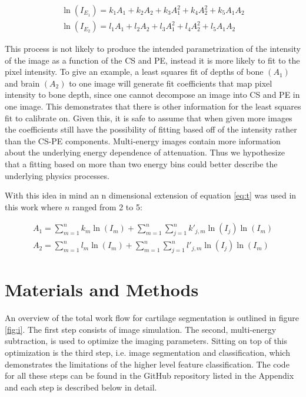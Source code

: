 \documentclass[a4paper,11pt]{article}
\begin{document}
\begin{subequations}\label{eq:t}
\begin{align}
\label{eq:t:1}
 \ln(I_{E_1}) = k_1 A_1 + k_2 A_2 +k_3A_1^2 +k_4 A_2^2 +k_5 A_1A_2 
\\
\label{eq:t:2}
\ln(I_{E_2}) = l_1 A_1 + l_2 A_2 +l_3A_1^2 +l_4 A_2^2 +l_5 A_1A_2 
\end{align}
\end{subequations}

This process is not likely to produce the intended parametrization of the intensity of the image as a function of the CS and PE, instead it is more likely to fit to the pixel intensity. To give an example, a least squares fit of depths of bone $(A_1)$ and brain $(A_2)$ to one image will generate fit coefficients that map pixel intensity to bone depth, since one cannot decompose an image into CS and PE in one image. This demonstrates that there is other information for the least squares fit to calibrate on. Given this, it is safe to assume that when given more images the coefficients still have the possibility of fitting based off of the intensity rather than the CS-PE components. Multi-energy images contain more information about the underlying energy dependence of attenuation. Thus we hypothesize that a fitting based on more than two energy bins could better describe the underlying physics processes.

With this idea in mind an n dimensional extension of equation \ref{eq:t} was used in this work where $n$ ranged from 2 to 5:

\begin{subequations}\label{eq:p}
\begin{align}
\label{eq:p:1}
A_1 = \sum_{m=1}^n k_{m} \ln(I_{m})  +\sum_{m=1}^n \sum_{j=1}^n  k'_{j,m} \ln(I_{j}) \ln(I_{m})
\\
\label{eq:p:2}
A_2 = \sum_{m=1}^n l_{m} \ln(I_{m})  +\sum_{m=1}^n \sum_{j=1}^n  l'_{j,m} \ln(I_{j}) \ln(I_{m})
\end{align}
\end{subequations}

\section{Materials and Methods}
\label{sec:methods}

An overview of the total work flow for cartilage segmentation is outlined in figure \ref{fig:i}. The first step consists of image  simulation. The second,  multi-energy subtraction, is  used  to  optimize  the  imaging  parameters. Sitting  on  top  of  this  optimization  is  the  third  step, i.e.  image segmentation  and  classification,  which  demonstrates  the  limitations  of  the  higher  level  feature  classification.  The  code for all  these  steps  can  be  found  in  the  GitHub  repository listed in the Appendix  and  each step is described below in detail.%
\\
\end{document}

